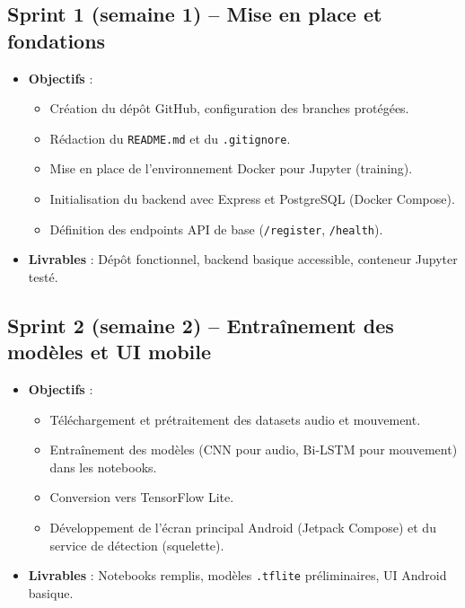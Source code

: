 \documentclass[11pt,a4paper]{article}
\begin{document}
\subsection{Sprint 1 (semaine 1) – Mise en place et fondations}
\begin{itemize}
    \item \textbf{Objectifs} :
        \begin{itemize}
            \item Création du dépôt GitHub, configuration des branches protégées.
            \item Rédaction du \texttt{README.md} et du \texttt{.gitignore}.
            \item Mise en place de l’environnement Docker pour Jupyter (training).
            \item Initialisation du backend avec Express et PostgreSQL (Docker Compose).
            \item Définition des endpoints API de base (\texttt{/register}, \texttt{/health}).
        \end{itemize}
    \item \textbf{Livrables} : Dépôt fonctionnel, backend basique accessible, conteneur Jupyter testé.
\end{itemize}

\subsection{Sprint 2 (semaine 2) – Entraînement des modèles et UI mobile}
\begin{itemize}
    \item \textbf{Objectifs} :
        \begin{itemize}
            \item Téléchargement et prétraitement des datasets audio et mouvement.
            \item Entraînement des modèles (CNN pour audio, Bi-LSTM pour mouvement) dans les notebooks.
            \item Conversion vers TensorFlow Lite.
            \item Développement de l’écran principal Android (Jetpack Compose) et du service de détection (squelette).
        \end{itemize}
    \item \textbf{Livrables} : Notebooks remplis, modèles \texttt{.tflite} préliminaires, UI Android basique.
\end{itemize}
\end{document}
